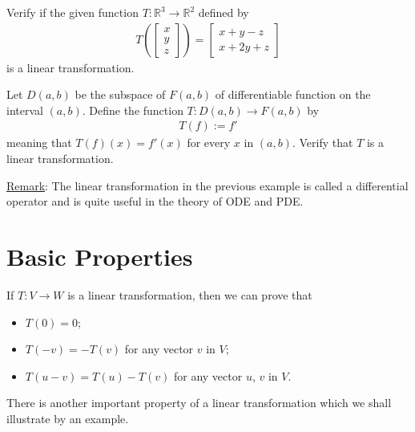 \documentclass[12pt,a4paper]{article}
\newcounter{example}[section]
\begin{document}
	\newpage
	
	\begin{example}
	Verify if the given function $T : \mathbb{R}^3 \rightarrow \mathbb{R}^2$ defined by
		\begin{align*}
		T \left( \begin{bmatrix}
		x \\ y \\ z
		\end{bmatrix} \right) = \begin{bmatrix}
		x + y - z \\ x + 2y + z
		\end{bmatrix}
		\end{align*}
	is a linear transformation.
	\end{example}
	
	\newpage
	
	\begin{example}
	Let $D(a, b)$ be the subspace of $F(a, b)$ of differentiable function on the interval $(a, b)$. Define the function $T : D (a, b) \rightarrow F (a, b)$ by
		\begin{align*}
		T (f) := f'
		\end{align*}
	meaning that $T (f) (x) = f'(x)$ for every $x$ in $(a, b)$. Verify that $T$ is a linear transformation.
	\end{example}
	
	\vfill
	
	\underline{Remark}: The linear transformation in the previous example is called a differential operator and is quite useful in the theory of ODE and PDE.
	
	\newpage
	
	\section{Basic Properties}
	If $T : V \rightarrow W$ is a linear transformation, then we can prove that
		\begin{itemize}
		\item $T(0) = 0$;
		\item $T(-v) = -T(v)$ for any vector $v$ in $V$;
		\item $T(u - v) = T(u) - T(v)$ for any vector $u$, $v$ in $V$.
		\end{itemize}
		
	There is another important property of a linear transformation which we shall illustrate by an example.
	
\end{document}
